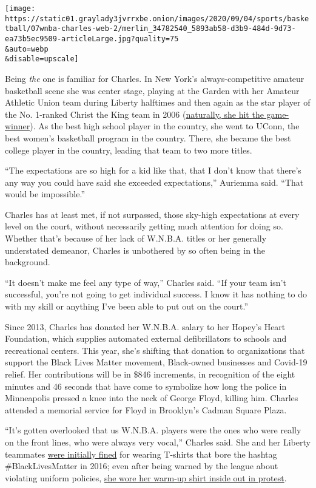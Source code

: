 \texttt{[image: https://static01.graylady3jvrrxbe.onion/images/2020/09/04/sports/basketball/07wnba-charles-web-2/merlin\_34782540\_5893ab58-d3b9-484d-9d73-ea73b5ec9509-articleLarge.jpg?quality=75\\\&auto=webp\\\&disable=upscale]}

Being \emph{the} one is familiar for Charles. In New York's
always-competitive amateur basketball scene she was center stage,
playing at the Garden with her Amateur Athletic Union team during
Liberty halftimes and then again as the star player of the No. 1-ranked
Christ the King team in 2006
(\href{https://www.nytimes3xbfgragh.onion/2006/01/16/sports/christ-the-king-comes-through.html}{naturally,
she hit the game-winner}). As the best high school player in the
country, she went to UConn, the best women's basketball program in the
country. There, she became the best college player in the country,
leading that team to two more titles.

``The expectations are so high for a kid like that, that I don't know
that there's any way you could have said she exceeded expectations,''
Auriemma said. ``That would be impossible.''

Charles has at least met, if not surpassed, those sky-high expectations
at every level on the court, without necessarily getting much attention
for doing so. Whether that's because of her lack of W.N.B.A. titles or
her generally understated demeanor, Charles is unbothered by so often
being in the background.

``It doesn't make me feel any type of way,'' Charles said. ``If your
team isn't successful, you're not going to get individual success. I
know it has nothing to do with my skill or anything I've been able to
put out on the court.''

Since 2013, Charles has donated her W.N.B.A. salary to her Hopey's Heart
Foundation, which supplies automated external defibrillators to schools
and recreational centers. This year, she's shifting that donation to
organizations that support the Black Lives Matter movement, Black-owned
businesses and Covid-19 relief. Her contributions will be in \$846
increments, in recognition of the eight minutes and 46 seconds that have
come to symbolize how long the police in Minneapolis pressed a knee into
the neck of George Floyd, killing him. Charles attended a memorial
service for Floyd in Brooklyn's Cadman Square Plaza.

``It's gotten overlooked that us W.N.B.A. players were the ones who were
really on the front lines, who were always very vocal,'' Charles said.
She and her Liberty teammates
\href{https://www.nytimes3xbfgragh.onion/2016/07/31/sports/basketball/tina-charles-new-york-liberty-wnba-protest.html}{were
initially fined} for wearing T-shirts that bore the hashtag
\#BlackLivesMatter in 2016; even after being warned by the league about
violating uniform policies,
\href{http://keezonsports.com/photos/2016/7/21/wnba-indiana-fever-vs-new-york-liberty}{she
wore her warm-up shirt inside out in protest}.

